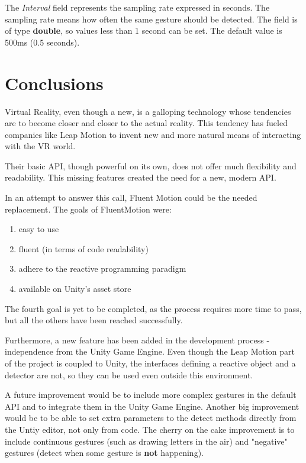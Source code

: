 \documentclass[12pt,a4paper,twoside]{report}
\begin{document}
The \textit{Interval} field represents the sampling rate expressed in seconds. The sampling rate means how often the same gesture should be detected. The field is of type \textbf{double}, so values less than 1 second can be set. The default value is 500ms (0.5 seconds).

\chapter{Conclusions}

Virtual Reality, even though a new, is a galloping technology whose tendencies are to become closer and closer to the actual reality. This tendency has fueled companies like Leap Motion to invent new and more natural means of interacting with the VR world.

Their basic API, though powerful on its own, does not offer much flexibility and readability. This missing features created the need for a new, modern API.

In an attempt to answer this call, Fluent Motion could be the needed replacement. The goals of FluentMotion were:

\begin{enumerate}
  \item easy to use
  \item fluent (in terms of code readability)
  \item adhere to the reactive programming paradigm
  \item available on Unity's asset store
\end{enumerate}

The fourth goal is yet to be completed, as the process requires more time to pass, but all the others have been reached successfully.

Furthermore, a new feature has been added in the development process - independence from the Unity Game Engine. Even though the Leap Motion part of the project is coupled to Unity, the interfaces defining a reactive object and a detector are not, so they can be used even outside this environment.

A future improvement would be to include more complex gestures in the default API and to integrate them in the Unity Game Engine. Another big improvement would be to be able to set extra parameters to the detect methods directly from the Untiy editor, not only from code. The cherry on the cake improvement is to include continuous gestures (such as drawing letters in the air) and "negative" gestures (detect when some gesture is \textbf{not} happening).

 


\end{document}
